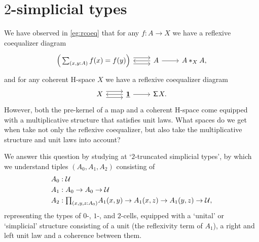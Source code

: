 \chapter{\texorpdfstring{$2$}{2}-simplicial types}\label{chap:simplicial}

We have observed in \cref{eg:rcoeq} that for any $f:A\to X$ we have a reflexive coequalizer diagram
\begin{equation*}
\begin{tikzcd}
\Big(\sm{x,y:A}f(x)=f(y)\Big) \arrow[r,yshift=1ex] \arrow[r,yshift=-1ex] & A \arrow[l] \arrow[r] & \join[X]{A}{A},
\end{tikzcd}
\end{equation*}
and for any coherent H-space $X$ we have a reflexive coequalizer diagram
\begin{equation*}
\begin{tikzcd}
X \arrow[r,yshift=1ex] \arrow[r,yshift=-1ex] & \unit \arrow[l] \arrow[r] & \susp X.
\end{tikzcd}
\end{equation*}
However, both the pre-kernel of a map and a coherent H-space come equipped with a multiplicative structure that satisfies unit laws. What spaces do we get when take not only the reflexive coequalizer, but also take the multiplicative structure and unit laws into account?

We answer this question by studying at `$2$-truncated simplicial types', by which we understand tiples $(A_0,A_1,A_2)$ consisting of
\begin{align*}
A_0 & : \UU \\
A_1 & : A_0 \to A_0 \to \UU\\
A_2 & : \prd{x,y,z:A_0} A_1(x,y) \to A_1(x,z)\to A_1(y,z) \to \UU,
\end{align*}
representing the types of $0$-, $1$-, and $2$-cells, equipped with a `unital' or `simplicial' structure consisting of a unit (the reflexivity term of $A_1$), a right and left unit law and a coherence between them.

